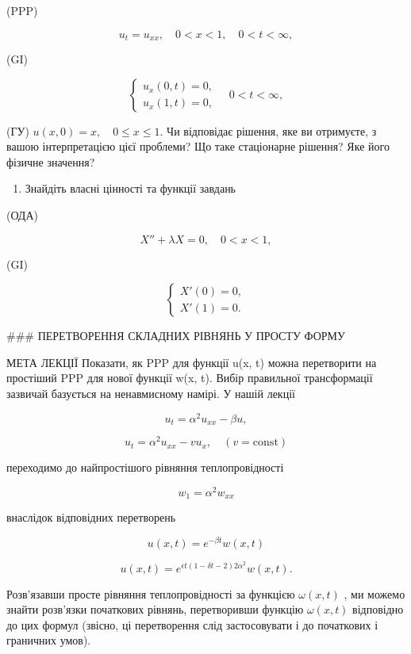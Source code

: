 \documentclass[
  ukrainian,
]{article}
\providecommand{\tightlist}{%
  \setlength{\itemsep}{0pt}\setlength{\parskip}{0pt}}
\begin{document}
(PPP)

\[
u_t = u_{xx}, \quad 0 < x < 1, \quad 0 < t < \infty,
\]

(GI)

\[
\begin{cases} u_x (0, t) = 0, \\ u_x (1, t) = 0, \end{cases} \quad 0 < t < \infty,
\]

(ГУ) \(u(x, 0) = x, \quad 0 \le x \le 1.\) Чи відповідає рішення, яке ви
отримуєте, з вашою інтерпретацією цієї проблеми? Що таке стаціонарне
рішення? Яке його фізичне значення?

\begin{enumerate}
\def\labelenumi{\arabic{enumi}.}
\setcounter{enumi}{3}
\tightlist
\item
  Знайдіть власні цінності та функції завдань
\end{enumerate}

(ОДА)

\[
X'' + \lambda X = 0, \quad 0 < x < 1,
\]

(GI)

\[
\begin{cases} X'(0) = 0, \\ X'(1) = 0. \end{cases}
\]

\#\#\# ПЕРЕТВОРЕННЯ СКЛАДНИХ РІВНЯНЬ У ПРОСТУ ФОРМУ

МЕТА ЛЕКЦІЇ Показати, як PPP для функції u(x, t) можна перетворити на
простіший PPP для нової функції w(x, t). Вибір правильної трансформації
зазвичай базується на ненавмисному намірі. У нашій лекції

\[
u_t = \alpha^2 u_{xx} - \beta u,
\]

\[
u_t = \alpha^2 u_{xx} - v u_x, \quad (v = \text{const})
\]

переходимо до найпростішого рівняння теплопровідності

\[
w_1 = \alpha^2 w_{xx}
\]

внаслідок відповідних перетворень

\[
u(x, t) = e^{-\beta t} w(x, t)
\]

\[
u(x, t) = e^{\epsilon t (1 - \delta t - 2) 2\alpha^2} w(x, t).
\]

Розв'язавши просте рівняння теплопровідності за функцією \(\omega(x,t)\)
, ми можемо знайти розв'язки початкових рівнянь, перетворивши функцію
\(\omega(x,t)\) відповідно до цих формул (звісно, ці перетворення слід
застосовувати і до початкових і граничних умов).
\end{document}
